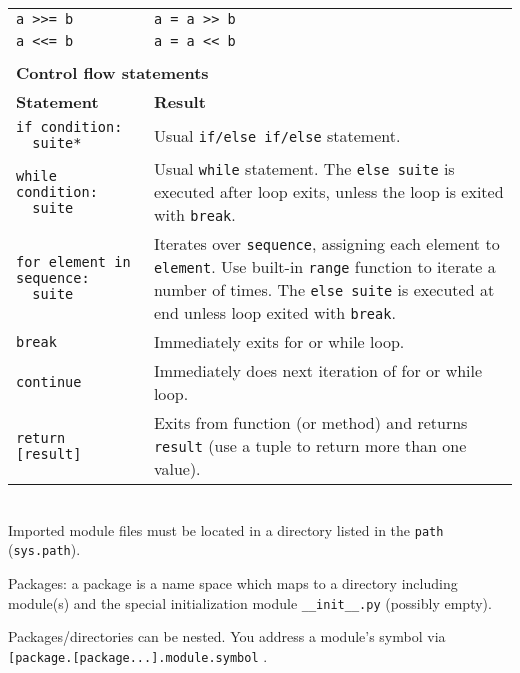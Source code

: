 \begin{longtable}{|p{5.5cm}|p{9.5cm}|}
\tt a >>= b 	& \tt a = a >> b	\\
\tt a <<= b 	& \tt a = a << b	\\
\hline
\multicolumn{2}{l}{}\\
\multicolumn{2}{l}{\bf Control flow statements}\\
\hline
\bf Statement & \bf Result \\
\hline
\tt if condition:\newline
\mbox{}\ \ suite* & Usual {\tt if/else if/else} statement.\\
\hline
\tt while condition:\newline
\mbox{}\ \ suite & Usual {\tt while} statement. The {\tt else suite} is executed after 
           loop exits, unless the loop is exited with {\tt break}.\\
\hline
\tt for element in sequence:\newline
\mbox{}\ \ suite & Iterates over {\tt sequence}, assigning each element to {\tt element}. 
           Use built-in {\tt range} function to iterate a number of times. 
	   The {\tt else suite} is executed at end unless loop exited with {\tt break}.\\
\hline
\tt break & Immediately exits for or while loop.\\
\tt continue & Immediately does next iteration of for or while loop.\\
\hline
\tt return [result] & Exits from function (or method) and returns {\tt result} 
                     (use a tuple to return more than one value).\\
\hline
\end{longtable}

\\
Imported module files must be located in a directory listed in the {\tt path} ({\tt sys.path}).
 
Packages: a package is a name space which maps to a directory including 
module(s) and the special initialization module {\tt \_\_init\_\_.py} (possibly empty).

Packages/directories can be nested. You address a module's symbol via \\
{\tt [package.[package...].module.symbol} .

